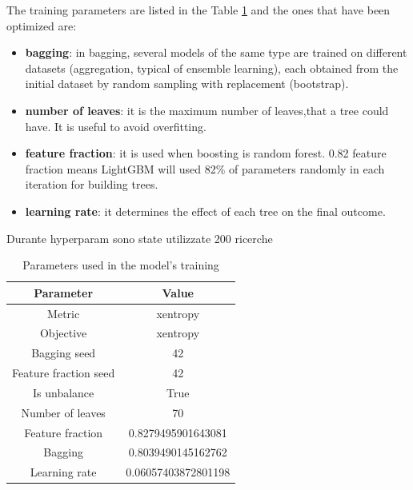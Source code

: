 \documentclass[a4paper, oneside]{book}
\begin{document}
			The training parameters are listed in the Table \ref{tab:parameters} and the ones that have been optimized are:
			\begin{itemize}
				\item \textbf{bagging}: in bagging, several models of the same type are trained on different datasets (aggregation, typical of ensemble learning), each obtained from the initial dataset by random sampling with replacement (bootstrap).
				\item \textbf{number of leaves}: it is the maximum number of leaves,that a tree could have. It is useful to avoid overfitting.
				\item \textbf{feature fraction}: it is used when boosting is random forest. 0.82 feature fraction means LightGBM will used 82\% of parameters randomly in each iteration for building trees.
				\item \textbf{learning rate}: it determines the effect of each tree on the final outcome.
			\end{itemize}
			Durante hyperparam sono state utilizzate 200 ricerche
			
			\begin{table}
				\centering
				\begin{tabular}{cc}
					\toprule[1.5pt]
					Parameter & Value\\
					\midrule
					Metric & xentropy \\
					Objective & xentropy \\
					Bagging seed & 42 \\
					Feature fraction seed & 42 \\
					Is unbalance & True \\
					Number of leaves & 70 \\
					Feature fraction & 0.8279495901643081 \\
					Bagging & 0.8039490145162762 \\
					Learning rate & 0.06057403872801198 \\
					\bottomrule[1.5pt]
				\end{tabular}
				\caption{Parameters used in the model's training}
				\label{tab:parameters}
			\end{table}
			
\end{document}
